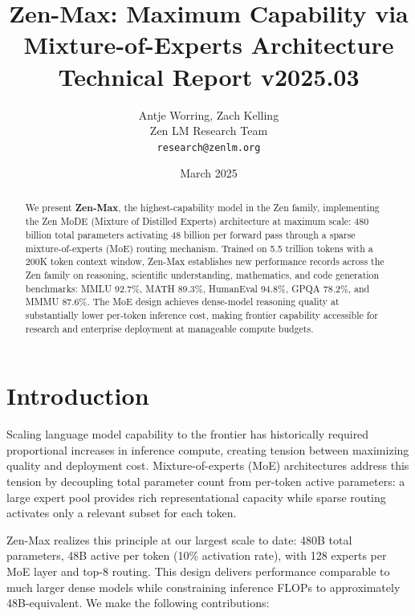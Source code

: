 \documentclass[11pt,a4paper]{article}
\title{\textbf{Zen-Max: Maximum Capability via Mixture-of-Experts Architecture}\\
\large Technical Report v2025.03}
\author{Antje Worring, Zach Kelling \\ Zen LM Research Team\\
\texttt{research@zenlm.org}}
\date{March 2025}
\begin{document}
\maketitle

\begin{abstract}
We present \textbf{Zen-Max}, the highest-capability model in the Zen family, implementing the
Zen MoDE (Mixture of Distilled Experts) architecture at maximum scale: 480 billion total
parameters activating 48 billion per forward pass through a sparse mixture-of-experts (MoE)
routing mechanism. Trained on 5.5 trillion tokens with a 200K token context window, Zen-Max
establishes new performance records across the Zen family on reasoning, scientific understanding,
mathematics, and code generation benchmarks: MMLU 92.7\%, MATH 89.3\%, HumanEval 94.8\%,
GPQA 78.2\%, and MMMU 87.6\%. The MoE design achieves dense-model reasoning quality at
substantially lower per-token inference cost, making frontier capability accessible for research
and enterprise deployment at manageable compute budgets.
\end{abstract}

\tableofcontents
\newpage

\section{Introduction}

Scaling language model capability to the frontier has historically required proportional
increases in inference compute, creating tension between maximizing quality and deployment
cost. Mixture-of-experts (MoE) architectures \cite{shazeer2017outrageously, fedus2022switch}
address this tension by decoupling total parameter count from per-token active parameters:
a large expert pool provides rich representational capacity while sparse routing activates
only a relevant subset for each token.

Zen-Max realizes this principle at our largest scale to date: 480B total parameters, 48B
active per token (10\% activation rate), with 128 experts per MoE layer and top-8 routing.
This design delivers performance comparable to much larger dense models while constraining
inference FLOPs to approximately 48B-equivalent. We make the following contributions:
\end{document}
